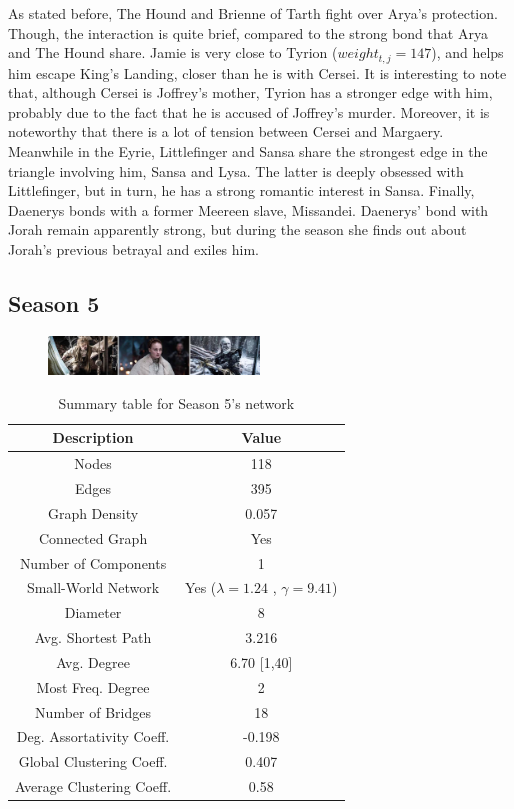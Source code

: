 \documentclass[10pt,twocolumn,letterpaper]{article}
\begin{document}
As stated before, The Hound and Brienne of Tarth fight over Arya's protection. Though, the interaction is quite brief, compared to the strong bond that Arya and The Hound share. Jamie is very close to Tyrion ($weight_{t,j}=147$), and helps him escape King's Landing, closer than he is with Cersei. It is interesting to note that, although Cersei is Joffrey's mother, Tyrion has a stronger edge with him, probably due to the fact that he is accused of Joffrey's murder. Moreover, it is noteworthy that there is a lot of tension between Cersei and Margaery.
Meanwhile in the Eyrie, Littlefinger and Sansa share the strongest edge in the triangle involving him, Sansa and Lysa. The latter is deeply obsessed with Littlefinger, but in turn, he has a strong romantic interest in Sansa. Finally, Daenerys bonds with a former Meereen slave, Missandei. Daenerys' bond with Jorah remain apparently strong, but during the season she finds out about Jorah's previous betrayal and exiles him. 




\subsection{Season 5}

\begin{figure}[!h]
    \centering
    \includegraphics[width=0.5\textwidth]{img/s5/s5_frames.jpg}
\end{figure}


\begin{table}[!h]
    \centering
    \small
    \begin{tabular}{c|c}
        Description & Value  \\
        \hline
        Nodes & 118\\
        Edges & 395 \\
        Graph Density & 0.057 \\
        Connected Graph & Yes \\
        Number of Components & 1 \\
        Small-World Network & Yes ($\lambda=1.24$ , $\gamma=9.41$) \\
        Diameter & 8 \\
        Avg. Shortest Path & 3.216 \\
        Avg. Degree & 6.70 [1,40] \\
        Most Freq. Degree & 2 \\
        Number of Bridges & 18 \\
        Deg. Assortativity Coeff. & -0.198\\
        Global Clustering Coeff. & 0.407 \\
        Average Clustering Coeff. & 0.58 \\
        \hline 
    \end{tabular}
    \vspace{0.2cm}
    \caption{Summary table for Season 5's network}
    \label{tab:my_label}
\end{table} 
\end{document}
